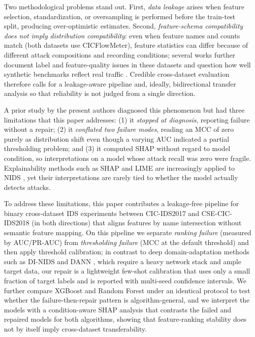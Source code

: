 \documentclass[11pt,a4paper]{article}
\begin{document}
Two methodological problems stand out. First, \emph{data leakage} arises when feature
selection, standardization, or oversampling is performed before the train-test split,
producing over-optimistic estimates. Second, \emph{feature-schema compatibility does not
imply distribution compatibility}: even when feature names and counts match (both datasets
use CICFlowMeter), feature statistics can differ because of different attack compositions
and recording conditions; several works further document label and feature-quality
issues in these datasets \cite{engelen,rosay,lanvin,liu,catillo} and question how well
synthetic benchmarks reflect real traffic \cite{layeghy}. Credible cross-dataset evaluation
therefore calls for a leakage-aware pipeline and, ideally, bidirectional transfer analysis
so that reliability is not judged from a single direction.

A prior study by the present authors diagnosed this phenomenon but had three
limitations that this paper addresses: (1) it \emph{stopped at diagnosis}, reporting failure without a repair;
(2) it \emph{conflated two failure modes}, reading an MCC of zero purely as distribution
shift even though a varying AUC indicated a partial thresholding problem; and (3) it
computed SHAP without regard to model condition, so interpretations on a model whose attack
recall was zero were fragile. Explainability methods such as SHAP \cite{lundberg} and
LIME \cite{ribeiro} are increasingly applied to NIDS \cite{arreche,gaspar,wang,mohale,alabbaadi},
yet their interpretations are rarely tied to whether the model actually detects attacks.

To address these limitations, this paper contributes a leakage-free pipeline for binary
cross-dataset IDS experiments between CIC-IDS2017 and CSE-CIC-IDS2018 (in both directions)
that aligns features by name intersection without semantic feature mapping. On this
pipeline we separate \emph{ranking failure} (measured by AUC/PR-AUC) from
\emph{thresholding failure} (MCC at the default threshold) and then apply threshold
calibration; in contrast to deep domain-adaptation methods such as DI-NIDS and DANN
\cite{layeghydi}, which require a heavy network stack and ample target data, our repair is
a lightweight few-shot calibration that uses only a small fraction of target labels and is
reported with multi-seed confidence intervals. We further compare XGBoost and Random Forest
under an identical protocol to test whether the failure-then-repair pattern is
algorithm-general, and we interpret the models with a condition-aware SHAP analysis that
contrasts the failed and repaired models for both algorithms, showing that feature-ranking
stability does not by itself imply cross-dataset transferability.
\end{document}
